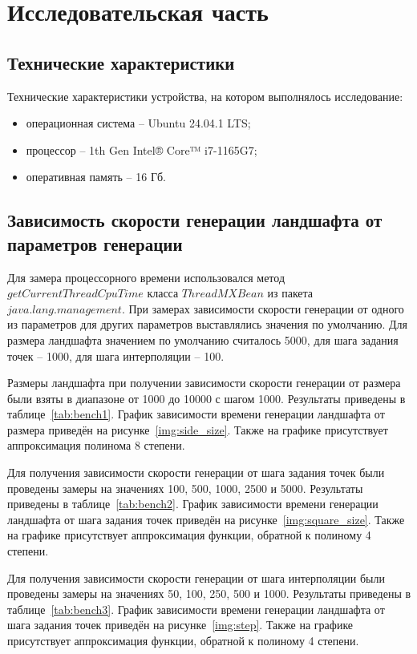 \chapter{Исследовательская часть}

\section{Технические характеристики}

Технические характеристики устройства, на котором выполнялось исследование:

\begin{itemize}
	\item операционная система -- Ubuntu 24.04.1 LTS;
	\item процессор -- 1th Gen Intel® Core™ i7-1165G7;
	\item оперативная память -- 16 Гб.
\end{itemize}

\section{Зависимость скорости генерации ландшафта от параметров генерации}

Для замера процессорного времени использовался метод $getCurrentThreadCpuTime$ класса $ThreadMXBean$ из пакета $java.lang.management$. При замерах зависимости скорости генерации от одного из параметров для других параметров выставлялись значения по умолчанию. Для размера ландшафта значением по умолчанию считалось 5000, для шага задания точек -- 1000, для шага интерполяции -- 100. 

Размеры ландшафта при получении зависимости скорости генерации от размера были взяты в диапазоне от 1000 до 10000 с шагом 1000. Результаты приведены в таблице~\ref{tab:bench1}. График зависимости времени генерации ландшафта от размера приведён на рисунке~\ref{img:side_size}. Также на графике присутствует аппроксимация полинома 8 степени.

Для получения зависимости скорости генерации от шага задания точек были проведены замеры на значениях 100, 500, 1000, 2500 и 5000. Результаты приведены в таблице~\ref{tab:bench2}. График зависимости времени генерации ландшафта от шага задания точек приведён на рисунке~\ref{img:square_size}. Также на графике присутствует аппроксимация функции, обратной к полиному 4 степени.

Для получения зависимости скорости генерации от шага интерполяции были проведены замеры на значениях 50, 100, 250, 500 и 1000. Результаты приведены в таблице~\ref{tab:bench3}. График зависимости времени генерации ландшафта от шага задания точек приведён на рисунке~\ref{img:step}. Также на графике присутствует аппроксимация функции, обратной к полиному 4 степени.

